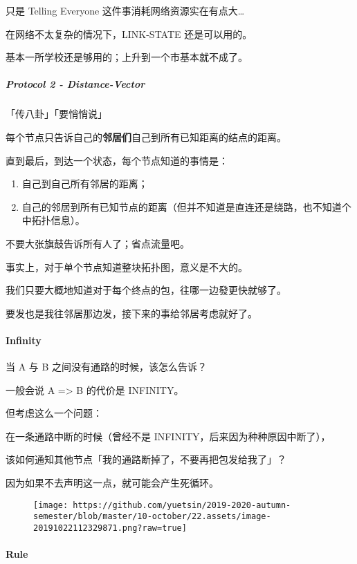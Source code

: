 \documentclass[
]{article}
\begin{document}
只是 Telling Everyone 这件事消耗网络资源实在有点大\ldots{}

在网络不太复杂的情况下，LINK-STATE 还是可以用的。

基本一所学校还是够用的；上升到一个市基本就不成了。

\hypertarget{header-n190}{%
\subparagraph{Protocol 2 - Distance-Vector}\label{header-n190}}

「传八卦」「要悄悄说」

每个节点只告诉自己的\textbf{邻居们}自己到所有已知距离的结点的距离。

直到最后，到达一个状态，每个节点知道的事情是：

\begin{enumerate}
\def\labelenumi{\arabic{enumi}.}
\item
  自己到自己所有邻居的距离；
\item
  自己的邻居到所有已知节点的距离（但并不知道是直连还是绕路，也不知道个中拓扑信息）。
\end{enumerate}

不要大张旗鼓告诉所有人了；省点流量吧。

事实上，对于单个节点知道整块拓扑图，意义是不大的。

我们只要大概地知道对于每个终点的包，往哪一边發更快就够了。

要发也是我往邻居那边发，接下来的事给邻居考虑就好了。

\hypertarget{header-n203}{%
\paragraph{Infinity}\label{header-n203}}

当 A 与 B 之间没有通路的时候，该怎么告诉？

一般会说 A =\textgreater{} B 的代价是 INFINITY。

但考虑这么一个问题：

在一条通路中断的时候（曾经不是 INFINITY，后来因为种种原因中断了），

该如何通知其他节点「我的通路断掉了，不要再把包发给我了」？

因为如果不去声明这一点，就可能会产生死循环。

\begin{figure}
\centering
\texttt{[image: https://github.com/yuetsin/2019-2020-autumn-semester/blob/master/10-october/22.assets/image-20191022112329871.png?raw=true]}
\caption{}
\end{figure}

\hypertarget{header-n211}{%
\paragraph{Rule}\label{header-n211}}
\end{document}
